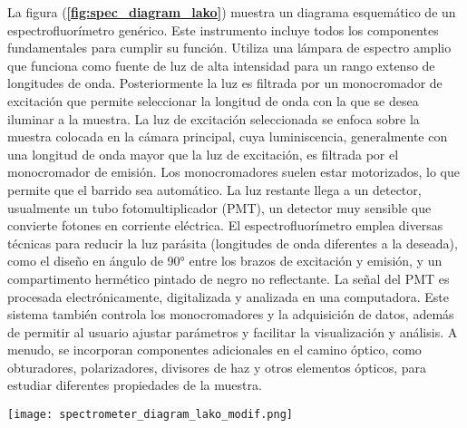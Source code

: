 La figura (\textbf{\ref{fig:spec_diagram_lako}}) muestra un diagrama esquemático de un espectrofluorímetro genérico.
Este instrumento incluye todos los componentes fundamentales para cumplir su función. 
Utiliza una lámpara de espectro amplio que funciona como fuente de luz de alta intensidad para un rango extenso de longitudes de onda. 
Posteriormente la luz es filtrada por un monocromador de excitación que permite seleccionar la longitud de onda con la que se desea iluminar a la muestra.
La luz de excitación seleccionada se enfoca sobre la muestra colocada en la cámara principal, cuya luminiscencia, generalmente con una longitud de onda mayor que la luz de excitación, es filtrada por el monocromador de emisión.
Los monocromadores suelen estar motorizados, lo que permite que el barrido sea automático. 
La luz restante llega a un detector, usualmente un tubo fotomultiplicador (PMT), un detector muy sensible que convierte fotones en corriente eléctrica.
El espectrofluorímetro emplea diversas técnicas para reducir la luz parásita (longitudes de onda diferentes a la deseada), como el diseño en ángulo de 90° entre los brazos de excitación y emisión, y un compartimento hermético pintado de negro no reflectante.
La señal del PMT es procesada electrónicamente, digitalizada y analizada en una computadora. 
Este sistema también controla los monocromadores y la adquisición de datos, además de permitir al usuario ajustar parámetros y facilitar la visualización y análisis.
A menudo, se incorporan componentes adicionales en el camino óptico, como obturadores, polarizadores, divisores de haz y otros elementos ópticos, para estudiar diferentes propiedades de la muestra.

\begin{SCfigure}
     \centering
     \texttt{[image: spectrometer\_diagram\_lako\_modif.png]}
     \caption{
    \textbf{Diagrama de un espectrofluorímetro típico.}
    La luz traza un camino que comienza en la lámpara (zona superior derecha) y termina en el PMT de detección (centro-izquierda). Después de salir de la lámpara, la luz es filtrada por un monocromador y luego enfocada sobre la muestra. La luz reemitida pasa por otro monocromador y termina en el PMT. La señal se lee con un sistema de control que la digitaliza y para luego ser procesada por una PC que construye los espectros. Figura tomada y adaptada de \cite{lakowicz_principles_2006}.
    }
     \label{fig:spec_diagram_lako}
\end{SCfigure}



